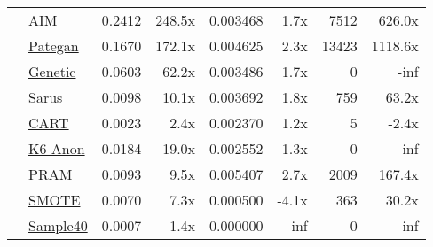 \begin{table}
\begin{tabular}{llr@{\hskip 6pt}r@{\hskip 14pt}r@{\hskip 6pt}r@{\hskip 14pt}rr}
        \cellcolor{ForestGreen} & \href{https://htmlpreview.github.io/?https://github.com/yoid2000/sdnist-summary/blob/main/results/aim_e_10_all/report.html}{AIM} & 0.2412 & 248.5x & 0.003468 & 1.7x & 7512 & 626.0x \\
        \cellcolor{ForestGreen} & \href{https://htmlpreview.github.io/?https://github.com/yoid2000/sdnist-summary/blob/main/results/pategan_n_iter_50_e_10_all/report.html}{Pategan} & 0.1670 & 172.1x & 0.004625 & 2.3x & 13423 & 1118.6x \\
        \cellcolor{YellowGreen} & \href{https://htmlpreview.github.io/?https://github.com/yoid2000/sdnist-summary/blob/main/results/genetic_sd_e_10_simple/report.html}{Genetic} & 0.0603 & 62.2x & 0.003486 & 1.7x & 0 & -inf \\
        \cellcolor{YellowGreen} & \href{https://htmlpreview.github.io/?https://github.com/yoid2000/sdnist-summary/blob/main/results/sarus_sdg_demographic/report.html}{Sarus} & 0.0098 & 10.1x & 0.003692 & 1.8x & 759 & 63.2x \\
        \cellcolor{SkyBlue} & \href{https://htmlpreview.github.io/?https://github.com/yoid2000/sdnist-summary/blob/main/results/cart_cf21/report.html}{CART} & 0.0023 & 2.4x & 0.002370 & 1.2x & 5 & -2.4x \\
        \cellcolor{pink} & \href{https://htmlpreview.github.io/?https://github.com/yoid2000/sdnist-summary/blob/main/results/k_anonymity_k_6/report.html}{K6-Anon} & 0.0184 & 19.0x & 0.002552 & 1.3x & 0 & -inf \\
        \cellcolor{Tan} & \href{https://htmlpreview.github.io/?https://github.com/yoid2000/sdnist-summary/blob/main/results/pram_default/report.html}{PRAM} & 0.0093 & 9.5x & 0.005407 & 2.7x & 2009 & 167.4x \\
        \cellcolor{Sepia} & \href{https://htmlpreview.github.io/?https://github.com/yoid2000/sdnist-summary/blob/main/results/smote_target_marital/report.html}{SMOTE} & 0.0070 & 7.3x & 0.000500 & -4.1x & 363 & 30.2x \\
        \cellcolor{Sepia} & \href{https://htmlpreview.github.io/?https://github.com/yoid2000/sdnist-summary/blob/main/results/subsample_40pcnt_all/report.html}{Sample40} & 0.0007 & -1.4x & 0.000000 & -inf & 0 & -inf \\
        \bottomrule
    \end{tabular}
\end{table}
